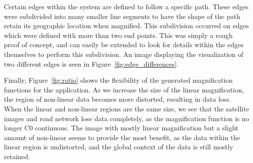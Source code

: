 Certain edges within the system are defined to follow a specific path. These edges were subdivided into many smaller line segments to have the shape of the path retain its geographic location when magnified. This subdivision occurred on edges which were defined with more than two end points. This was simply a rough proof of concept, and can easily be extended to look for details within the edges themselves to perform this subdivision. An image displaying the visualization of two different
edges is seen in Figure~\ref{fig:edge_differences}. 

Finally, Figure~\ref{fig:ratio} shows the flexibility of the generated magnification functions for the application. As we increase the size of the linear magnification, the region of non-linear data becomes more distorted, resulting in data loss. When the linear and non-linear regions are the same size, we see that the satellite images and road network lose data completely, as the magnification function is no longer C0 continuous. The image with mostly linear magnification
but a slight amount of non-linear seems to provide the most benefit, as the data within the linear region is undistorted, and the global context of the data is still mostly retained.


